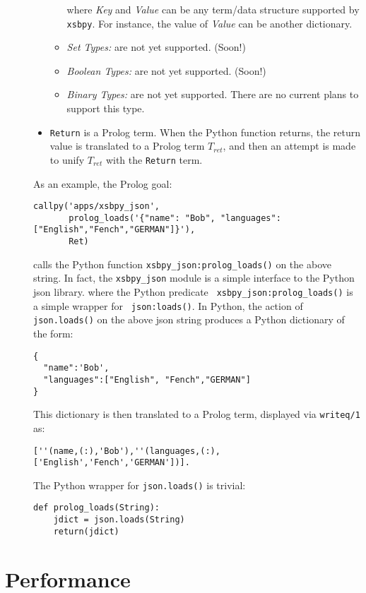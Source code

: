 \begin{description}
\begin{itemize}
\begin{itemize}
         where {\em Key} and {\em Value} can be any term/data
         structure supported by {\tt xsbpy}.  For instance, the value
         of {\em Value} can be another dictionary.
       \item {\em Set Types:} are not yet supported.  (Soon!)
       \item {\em Boolean Types:} are not yet supported. (Soon!)
       \item {\em Binary Types:} are not yet supported.  There are no
         current plans to support this type.
     \end{itemize}
   \item {\tt Return} is a Prolog term.  When the Python function
     returns, the return value is translated to a Prolog term
     $T_{ret}$, and then an attempt is made to unify $T_{ret}$ with
     the {\tt Return} term.
 \end{itemize}

 As an example, the Prolog goal:

 \begin{verbatim}
callpy('apps/xsbpy_json',
       prolog_loads('{"name": "Bob", "languages": ["English","Fench","GERMAN"]}'),
       Ret)
\end{verbatim}
 
\noindent 
calls the Python function {\tt xsbpy\_json:prolog\_loads()} on the
above string.  In fact, the {\tt xsbpy\_json} module is a simple
interface to the Python json library. where the Python predicate {\tt
  xsbpy\_json:prolog\_loads()} is a simple wrapper for {\tt
  json:loads()}.  In Python, the action of {\tt json.loads()} on the
above json string produces a Python dictionary of the form:
\begin{verbatim}
{
  "name":'Bob',
  "languages":["English", "Fench","GERMAN"]
}
\end{verbatim}
This dictionary is then translated to a Prolog term, displayed via
{\tt writeq/1} as:
\begin{verbatim}
[''(name,(:),'Bob'),''(languages,(:),['English','Fench','GERMAN'])].
\end{verbatim}

The Python wrapper for {\tt json.loads()} is trivial:
\begin{verbatim}
def prolog_loads(String):
    jdict = json.loads(String)
    return(jdict)
\end{verbatim}
\end{description}

\section{Performance}

